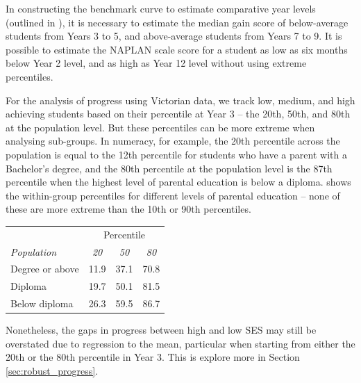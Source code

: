 In constructing the benchmark curve to estimate comparative year levels (outlined in ), it is necessary to estimate the median gain score of below-average students from Years 3 to 5, and above-average students from Years 7 to 9. It is possible to estimate the NAPLAN scale score for a student as low as six months below Year 2 level, and as high as Year 12 level without using extreme percentiles.

For the analysis of progress using Victorian data, we track low, medium, and high achieving students based on their percentile at Year 3 -- the 20th, 50th, and 80th at the population level. But these percentiles can be more extreme when analysing sub-groups. In numeracy, for example, the 20th percentile across the population is equal to the 12th percentile for students who have a parent with a Bachelor's degree, and the 80th percentile at the population level is the 87th percentile when the highest level of parental education is below a diploma.  shows the within-group percentiles for different levels of parental education -- none of these are more extreme than the 10th or 90th percentiles.

\begin{table}[htbp]
  \centering
    \begin{tabular}{lccc}

  & \multicolumn{3}{c}{Percentile} \\
\cmidrule(lr){2-4}
    \textit{Population} & \textit{20}    & \textit{50}    & \textit{80} \\
    Degree or above & 11.9  & 37.1  & 70.8 \\
    Diploma & 19.7  & 50.1  & 81.5 \\
    Below diploma & 26.3  & 59.5  & 86.7 \\
    \bottomrule
    \end{tabular}%
  \label{tab:percentiles}%
\begin{flushleft}\end{flushleft}
\vspace{-6pt}
\end{table}%

\newpage
Nonetheless, the gaps in progress between high and low SES may still be overstated due to regression to the mean, particular when starting from either the 20th or the 80th percentile in Year 3. This is explore more in Section \ref{sec:robust_progress}.

